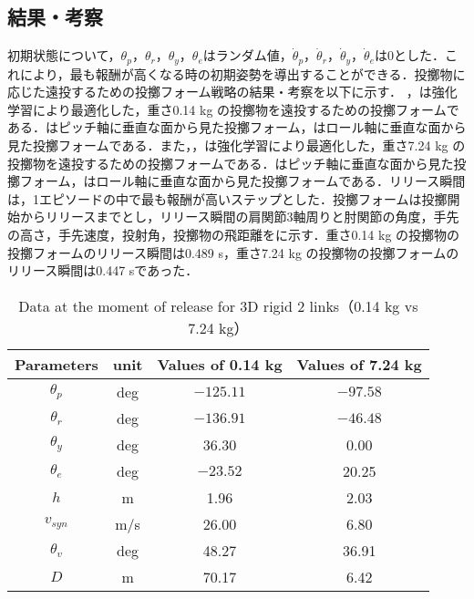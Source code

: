 \subsection{結果・考察}
初期状態について，$\theta_{p}$，$\theta_{r}$，$\theta_{y}$，$\theta_{e}$はランダム値，$\dot{\theta}_{p}$，$\dot{\theta}_{r}$，$\dot{\theta}_{y}$，$\dot{\theta}_{e}$は0とした．これにより，最も報酬が高くなる時の初期姿勢を導出することができる．投擲物に応じた遠投するための投擲フォーム戦略の結果・考察を以下に示す．
，は強化学習により最適化した，重さ0.14 kg の投擲物を遠投するための投擲フォームである．はピッチ軸に垂直な面から見た投擲フォーム，はロール軸に垂直な面から見た投擲フォームである．また，，は強化学習により最適化した，重さ7.24 kg の投擲物を遠投するための投擲フォームである．はピッチ軸に垂直な面から見た投擲フォーム，はロール軸に垂直な面から見た投擲フォームである．リリース瞬間は，1エピソードの中で最も報酬が高いステップとした．投擲フォームは投擲開始からリリースまでとし，リリース瞬間の肩関節3軸周りと肘関節の角度，手先の高さ，手先速度，投射角，投擲物の飛距離をに示す．重さ0.14 kg の投擲物の投擲フォームのリリース瞬間は0.489 s，重さ7.24 kg の投擲物の投擲フォームのリリース瞬間は0.447 sであった．

\begin{table}[tb]
  \begin{center}
    \caption{Data at the moment of release for 3D rigid 2 links（0.14 kg vs 7.24 kg）}
    \begin{tabular}{c|c|c|c}
      \hline
      Parameters & unit & Values of 0.14 kg & Values of 7.24 kg \\
      \hline
      $\theta_{p}$ & deg & $-125.11$ & $-97.58$ \\
      $\theta_{r}$ & deg & $-136.91$ & $-46.48$ \\
      $\theta_{y}$ & deg  & 36.30 & 0.00 \\
      $\theta_{e}$ & deg & $-23.52$ & 20.25 \\
      $h$ & m & 1.96 & 2.03 \\
      $v_{syn}$ & m/s & 26.00 & 6.80 \\
      $\theta_{v}$ & deg & 48.27 & 36.91 \\
      $D$ & m & 70.17 & 6.42 \\
      \hline
    \end{tabular}
  \end{center}
\end{table}

